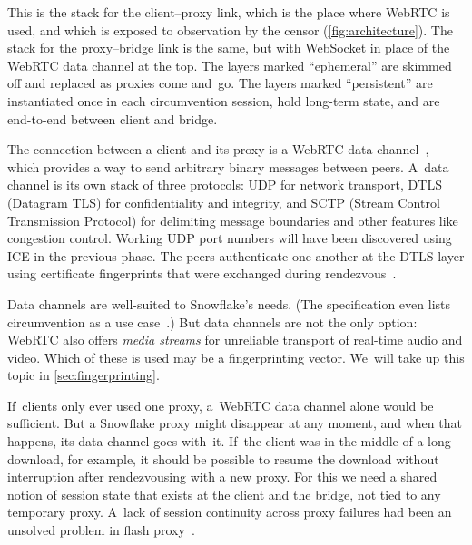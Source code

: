 \documentclass[letterpaper,twocolumn]{article}
\newcommand{\firstterm}[1]{\textit{#1}}
\begin{document}
\bigskip

\noindent
This is the stack for the client--proxy link,
which is the place where WebRTC is used, and which is
exposed to observation by the censor (\autoref{fig:architecture}).
The stack for the proxy--bridge link is the same,
but with WebSocket in place of the
WebRTC data channel at the top.
The layers marked ``ephemeral'' are skimmed off
and replaced as proxies come and~go.
The layers marked ``persistent'' are instantiated once
in each circumvention session,
hold long-term state,
and are end-to-end between client and bridge.

The connection between a client and its proxy is
a WebRTC data channel~\cite{rfc8831},
which provides a way to send arbitrary binary messages between peers.
A~data channel is its own stack of three protocols:
UDP for network transport,
DTLS (Datagram TLS)
for confidentiality and integrity, and
SCTP (Stream Control Transmission Protocol)
for delimiting message boundaries
and other features like congestion control.
Working UDP port numbers will have been discovered
using ICE in the previous phase.
The peers authenticate one another
at the DTLS layer using certificate fingerprints
that were exchanged during rendezvous~\cite[\S 5.1]{rfc8842}.

Data channels are well-suited to Snowflake's needs.
(The specification even lists circumvention as a use case~\cite[\S 3.2]{rfc8831}.)
But data channels are not the only option:
WebRTC also offers \firstterm{media streams}
for unreliable transport of real-time audio and video.
Which of these is used may be a fingerprinting vector.
We~will take up this topic in \autoref{sec:fingerprinting}.

If~clients only ever used one proxy,
a~WebRTC data channel alone would be sufficient.
But a Snowflake proxy might
disappear at any moment,
and when that happens, its data channel goes with~it.
If~the client was in the middle of a long download,
for example, it should be possible to resume the download
without interruption after rendezvousing with a new proxy.
For this we need a shared notion of session state that exists
at the client and the bridge, not tied to any temporary proxy.
A~lack of session continuity across proxy failures
had been an unsolved problem in flash proxy~\cite[\S 5.2]{Fifield2012a}.
\end{document}
